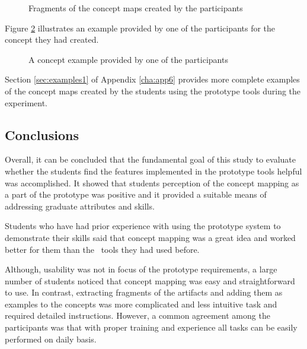 \begin{figure}[htb]
\centering
\setlength\fboxsep{0pt}
\setlength\fboxrule{0.5pt}
\caption{Fragments of the concept maps created by the participants}
\label{fig:stdmap}
\end{figure}

\FloatBarrier

Figure \ref{fig:stdmap2} illustrates an example provided by one of the
participants for the concept they had created.

\begin{figure}[htb]
\centering
\setlength\fboxsep{0pt}
\setlength\fboxrule{0.5pt}
\caption{A concept example provided by one of the participants}
\label{fig:stdmap2}
\end{figure}

Section \ref{sec:examples1} of Appendix \ref{cha:app6} provides more complete
examples of the concept maps created by the students using the prototype tools
during the experiment.

\subsection{Conclusions}

Overall, it can be concluded that the fundamental goal of this study to evaluate
whether the students find the features implemented in the prototype tools helpful
was accomplished. It showed that students perception of the concept mapping as a
part of the prototype was positive and it provided a suitable means of
addressing graduate attributes and \LLLs skills.

Students who have had prior experience with using the prototype system to
demonstrate their \LLLs skills said that concept mapping was a great idea and
worked better for them than the \ep~tools they had used before.

Although, usability was not in focus of the prototype requirements, a large
number of students noticed that concept mapping was easy and straightforward to
use. In contrast, extracting fragments of the artifacts and adding them as
examples to the concepts was more complicated and less intuitive task and
required detailed instructions. However, a common agreement among the
participants was that with proper training and experience all tasks can be
easily performed on daily basis.

